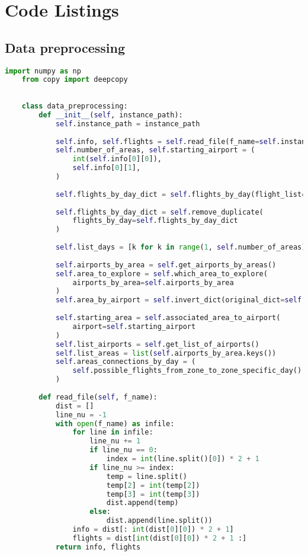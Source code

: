 \chapter{Code Listings}
\label{AppendixA}

\section{Data preprocessing}
\begin{lstlisting}[language = Python]
    import numpy as np
    from copy import deepcopy
    
    
    class data_preprocessing:
        def __init__(self, instance_path):
            self.instance_path = instance_path
    
            self.info, self.flights = self.read_file(f_name=self.instance_path)
            self.number_of_areas, self.starting_airport = (
                int(self.info[0][0]),
                self.info[0][1],
            )
    
            self.flights_by_day_dict = self.flights_by_day(flight_list=self.flights)
    
            self.flights_by_day_dict = self.remove_duplicate(
                flights_by_day=self.flights_by_day_dict
            )
    
            self.list_days = [k for k in range(1, self.number_of_areas)]
    
            self.airports_by_area = self.get_airports_by_areas()
            self.area_to_explore = self.which_area_to_explore(
                airports_by_area=self.airports_by_area
            )
            self.area_by_airport = self.invert_dict(original_dict=self.airports_by_area)
    
            self.starting_area = self.associated_area_to_airport(
                airport=self.starting_airport
            )
            self.list_airports = self.get_list_of_airports()
            self.list_areas = list(self.airports_by_area.keys())
            self.areas_connections_by_day = (
                self.possible_flights_from_zone_to_zone_specific_day()
            )
    
        def read_file(self, f_name):
            dist = []
            line_nu = -1
            with open(f_name) as infile:
                for line in infile:
                    line_nu += 1
                    if line_nu == 0:
                        index = int(line.split()[0]) * 2 + 1
                    if line_nu >= index:
                        temp = line.split()
                        temp[2] = int(temp[2])
                        temp[3] = int(temp[3])
                        dist.append(temp)
                    else:
                        dist.append(line.split())
                info = dist[: int(dist[0][0]) * 2 + 1]
                flights = dist[int(dist[0][0]) * 2 + 1 :]
            return info, flights
    

\end{lstlisting}
